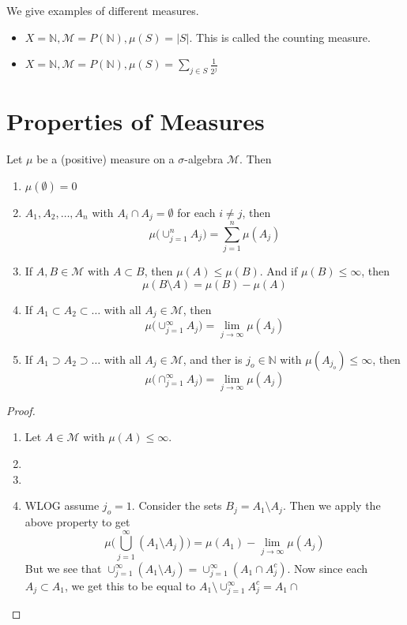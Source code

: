 \begin{example}
  We give examples of different measures.
  \begin{itemize}[]
    \item $X = \mathbb{N}, \mathcal{M} = P(\mathbb{N}), \mu(S) = |S|$.
      This is called the counting measure.
    \item $X = \mathbb{N}, \mathcal{M} = P(\mathbb{N}), \mu(S) = \sum_{j \in S} \frac{1}{2^j}$
  \end{itemize}
\end{example}

\section{Properties of Measures}
\begin{proposition}
  Let $\mu$ be a (positive) measure on a $\sigma$-algebra $\mathcal{M}$. Then \begin{enumerate}[label=(\arabic*)]
    \item $\mu(\emptyset) = 0$
    \item $A_1, A_2, \ldots , A_n$ with $A_i \cap A_j = \emptyset$ for each $i \neq j$, then  \[
        \mu \Big( \cup_{j = 1}^{n}A_j\Big) = \sum_{j = 1}^{n} \mu(A_j)
    \]
  \item If $A, B \in \mathcal{M}$ with $A \subset B$, then $\mu(A) \le \mu(B)$. And if $\mu(B) \le \infty$, then \[
      \mu(B \setminus A)  = \mu(B) - \mu(A)
  \]
    \item If $A_1 \subset A_2 \subset \ldots$ with all $A_j \in \mathcal{M}$, then \[
        \mu \Big( \cup_{j = 1}^{\infty}A_j\Big) = \lim_{j \to \infty} \mu( A_j)
    \]
  \item If $A_1 \supset A_2 \supset \ldots $ with all $A_j \in \mathcal{M}$, and ther is $j_o \in \mathbb{N}$ with $\mu(A_{j_o}) \le \infty$, then \[
      \mu \Big( \cap_{j = 1}^{\infty}A_j\Big) = \lim_{j \to \infty} \mu(A_j)
  \]
  \end{enumerate}
\end{proposition}
\begin{proof}
  \begin{enumerate}[label=\arabic*]
    \item Let $A \in \mathcal{M}$ with $\mu(A) \le \infty$. 
    \item 
    \item 
    \item WLOG assume $j_o = 1$. Consider the sets $B_j = A_1 \setminus A_j$. Then we apply the above property to get \[
        \mu \Big( \bigcup_{j = 1}^{\infty}(A_1 \setminus A_j)\Big) = \mu(A_1) - \lim_{j \to \infty} \mu(A_j)
    \]
      But we see that $\cup_{j = 1}^{\infty}(A_1 \setminus A_j) = \cup_{ j = 1}^{\infty}(A_1 \cap A_j^c)$. Now since each $A_j \subset A_1$, we get this to be equal to $A_1 \setminus \cup_{j = 1}^{\infty}A_j^c = A_1 \cap  $
  \end{enumerate}
\end{proof}
